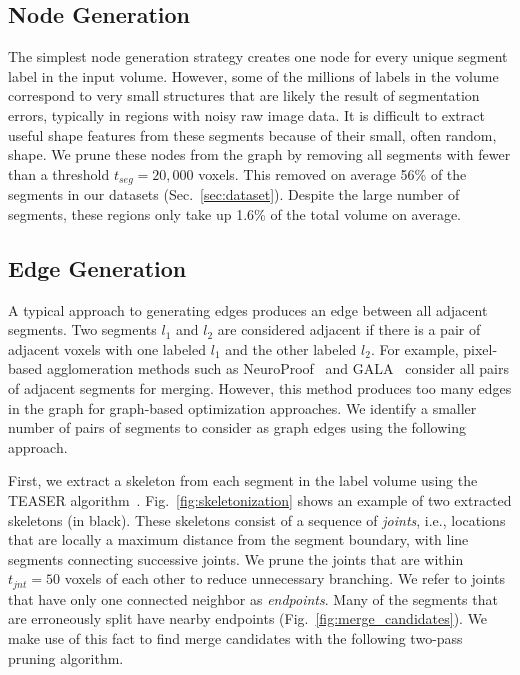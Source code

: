 

\subsection{Node Generation}
\label{sec:skeletonization}

The simplest node generation strategy creates one node for every unique segment label in the input volume. However, some of the millions of labels in the volume correspond to very small structures that are likely the result of segmentation errors, typically in regions with noisy raw image data. It is difficult to extract useful shape features from these segments because of their small, often random, shape. We prune these nodes from the graph by removing all segments with fewer than a threshold $t_{seg} = 20,000$ voxels. This removed on average 56\% of the segments in our  datasets (Sec.~\ref{sec:dataset}). Despite the large number of segments, these regions only take up 1.6\% of the total volume on average.

\subsection{Edge Generation}

A typical approach to generating edges produces an edge between all adjacent segments. Two segments $l_1$ and $l_2$ are considered adjacent if there is a pair of adjacent voxels with one labeled $l_1$ and the other labeled $l_2$.
For example, pixel-based agglomeration methods such as NeuroProof~\cite{10.1371/journal.pone.0125825} and GALA~\cite{nunez2014graph} consider all pairs of adjacent segments for merging.
However, this method produces too many edges in the graph for graph-based optimization approaches. We identify a smaller number of pairs of segments to consider as graph edges using the following approach.

First, we extract a skeleton from each segment in the label volume using the TEASER algorithm~\cite{sato2000teasar,zhao2014automatic}. Fig.~\ref{fig:skeletonization} shows an example of two extracted skeletons (in black). These skeletons consist of a sequence of \textit{joints}, i.e., locations that are locally a maximum distance from the segment boundary, with line segments connecting successive joints. We prune the joints that are within $t_{jnt} = 50$ voxels of each other to reduce unnecessary branching. We refer to joints that have only one connected neighbor as \textit{endpoints}. Many of the segments that are erroneously split have nearby endpoints  (Fig.~\ref{fig:merge_candidates}). We make use of this fact to find merge candidates with the following two-pass pruning algorithm.

